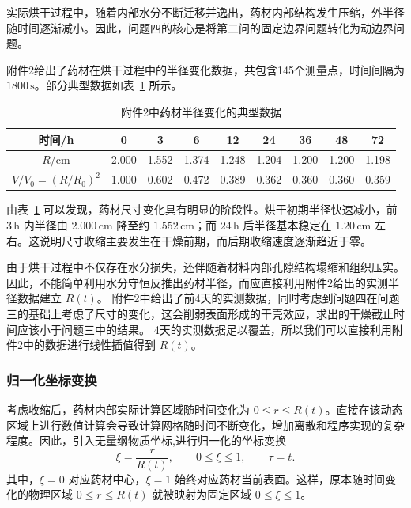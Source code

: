 \documentclass[12pt,a4paper]{article}
\begin{document}
实际烘干过程中，随着内部水分不断迁移并逸出，药材内部结构发生压缩，外半径随时间逐渐减小。因此，问题四的核心是将第二问的固定边界问题转化为动边界问题。

附件2给出了药材在烘干过程中的半径变化数据，共包含145个测量点，时间间隔为 \(1800\,\mathrm{s}\)。部分典型数据如表~\ref{tab:radius4} 所示。

\begin{table}[htbp]
\centering
\caption{附件2中药材半径变化的典型数据}
\label{tab:radius4}
\renewcommand{\arraystretch}{1.15}
\begin{tabular}{ccccccccc}
\toprule
时间/h & 0 & 3 & 6 & 12 & 24 & 36 & 48 & 72 \\
\midrule
\(R\)/cm & 2.000 & 1.552 & 1.374 & 1.248 & 1.204 & 1.200 & 1.200 & 1.198 \\
\(V/V_0=(R/R_0)^2\) & 1.000 & 0.602 & 0.472 & 0.389 & 0.362 & 0.360 & 0.360 & 0.359 \\
\bottomrule
\end{tabular}
\end{table}

由表~\ref{tab:radius4} 可以发现，药材尺寸变化具有明显的阶段性。烘干初期半径快速减小，前 \(3\,\mathrm{h}\) 内半径由 \(2.000\,\mathrm{cm}\) 降至约 \(1.552\,\mathrm{cm}\)；而 \(24\,\mathrm{h}\) 后半径基本稳定在 \(1.20\,\mathrm{cm}\) 左右。这说明尺寸收缩主要发生在干燥前期，而后期收缩速度逐渐趋近于零。

由于烘干过程中不仅存在水分损失，还伴随着材料内部孔隙结构塌缩和组织压实。因此，不能简单利用水分守恒反推出药材半径\cite{dasilva2014}，而应直接利用附件2给出的实测半径数据建立 \(R(t)\)\cite{liu2022}。
附件2中给出了前4天的实测数据，同时考虑到问题四在问题三的基础上考虑了尺寸的变化，这会削弱表面形成的干壳效应，求出的干燥截止时间应该小于问题三中的结果。
4天的实测数据足以覆盖，所以我们可以直接利用附件2中的数据进行线性插值得到 $R(t)$。

\subsubsection{归一化坐标变换}

考虑收缩后，药材内部实际计算区域随时间变化为 \(0\le r\le R(t)\)。直接在该动态区域上进行数值计算会导致计算网格随时间不断变化，增加离散和程序实现的复杂程度。因此，引入无量纲物质坐标,进行归一化的坐标变换\cite{adrover2019}
\begin{equation}
\xi=\frac{r}{R(t)}
,
\qquad
0\le \xi\le 1,
\qquad
\tau=t.
\label{eq:xi4}
\end{equation}
其中，\(\xi=0\) 对应药材中心，\(\xi=1\) 始终对应药材当前表面。这样，原本随时间变化的物理区域 \(0\le r\le R(t)\) 就被映射为固定区域 \(0\le\xi\le1\)。
\end{document}
